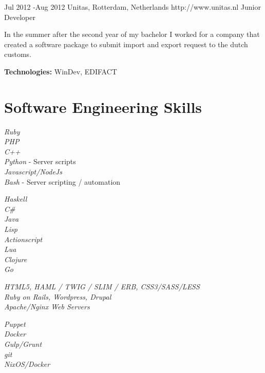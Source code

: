 \documentclass[10pt]{article} %
\begin{document}
\job
{Jul 2012 -}{Aug 2012}
{Unitas, Rotterdam, Netherlands}
{http://www.unitas.nl}
{Junior Developer}
{In the summer after the second year of my bachelor I worked for a company that created a software package to submit import and export request to the dutch customs.

\rule{0mm}{5mm}\textbf{Technologies:} WinDev, EDIFACT
}


\section{Software Engineering Skills}

{
\textit{Ruby}\\
\textit{PHP}\\
\textit{C++}\\
\textit{Python} - Server scripts\\
\textit{Javascript/NodeJs}\\
\textit{Bash} - Server scripting / automation 
}

{
  \textit{Haskell}\\
  \textit{C\#}\\
  \textit{Java}\\
  \textit{Lisp}\\
  \textit{Actionscript}\\
  \textit{Lua} \\
  \textit{Clojure}\\
  \textit{Go}\\
}


{
\textit{HTML5, HAML / TWIG / SLIM / ERB, CSS3/SASS/LESS}\\
\textit{Ruby on Rails, Wordpress, Drupal}\\
\textit{Apache/Nginx Web Servers}\\
}


{
\textit{Puppet}\\
\textit{Docker}\\
\textit{Gulp/Grunt}\\
\textit{git}\\
\textit{NixOS/Docker}\\
}
\end{document}
